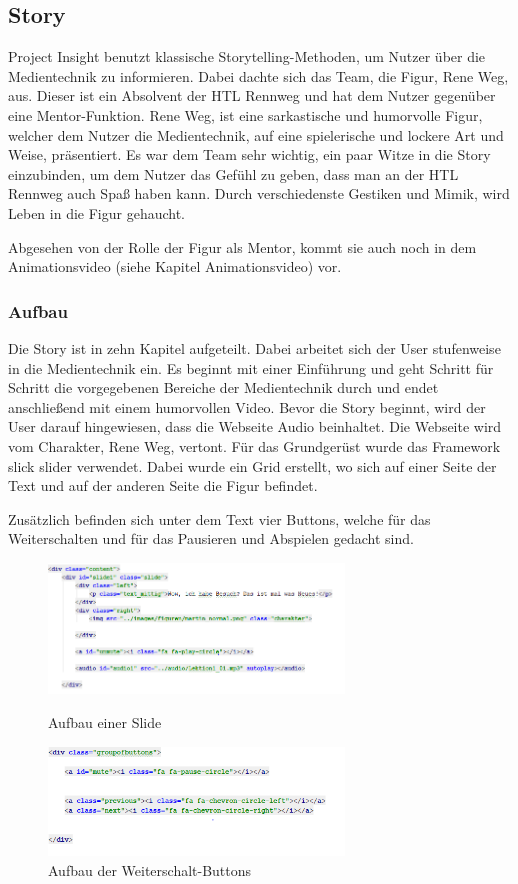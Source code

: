 \subsection{Story}
Project Insight benutzt klassische Storytelling-Methoden, um Nutzer über die Medientechnik zu informieren. Dabei dachte sich das Team, die Figur, Rene Weg, aus. Dieser ist ein Absolvent der HTL Rennweg und hat dem Nutzer gegenüber eine Mentor-Funktion. Rene Weg, ist eine sarkastische und humorvolle Figur, welcher dem Nutzer die Medientechnik, auf eine spielerische und lockere Art und Weise, präsentiert. Es war dem Team sehr wichtig, ein paar Witze in die Story einzubinden, um dem Nutzer das Gefühl zu geben, dass man an der HTL Rennweg auch Spaß haben kann. Durch verschiedenste Gestiken und Mimik, wird Leben in die Figur gehaucht. 

Abgesehen von der Rolle der Figur als Mentor, kommt sie auch noch in dem Animationsvideo (siehe Kapitel Animationsvideo) vor. 

\subsubsection{Aufbau}
Die Story ist in zehn Kapitel aufgeteilt. Dabei arbeitet sich der User stufenweise in die Medientechnik ein. Es beginnt mit einer Einführung und geht Schritt für Schritt die vorgegebenen Bereiche der Medientechnik durch und endet anschließend mit einem humorvollen Video. Bevor die Story beginnt, wird der User darauf hingewiesen, dass die Webseite Audio beinhaltet. Die Webseite wird vom Charakter, Rene Weg, vertont. 
Für das Grundgerüst wurde das Framework slick slider verwendet. Dabei wurde ein Grid erstellt, wo sich auf einer Seite der Text und auf der anderen Seite die Figur befindet. 

Zusätzlich befinden sich unter dem Text vier Buttons, welche für das Weiterschalten und für das Pausieren und Abspielen gedacht sind. 

\begin{figure}[H] 
  \centering
     \includegraphics[width=0.7\textwidth]{webseite_abb4.png}
  \caption{Aufbau einer Slide}
  
  \centering
  	\includegraphics[width=0.7\textwidth]{webseite_abb5.png}
  \caption{Aufbau der Weiterschalt-Buttons}

\end{figure}

